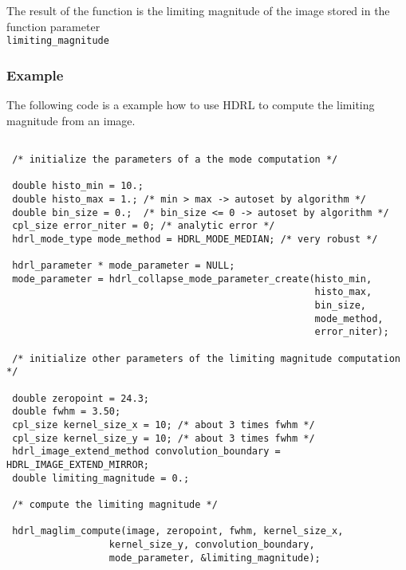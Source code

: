 The result of the function is the limiting magnitude of the image
stored in the function parameter\\ \verb+limiting_magnitude+


\subsubsection{Example}
The following code is a example how to use HDRL to compute the limiting
magnitude from an image.

\begin{lstlisting}
 
 /* initialize the parameters of a the mode computation */

 double histo_min = 10.;
 double histo_max = 1.; /* min > max -> autoset by algorithm */
 double bin_size = 0.;  /* bin_size <= 0 -> autoset by algorithm */
 cpl_size error_niter = 0; /* analytic error */
 hdrl_mode_type mode_method = HDRL_MODE_MEDIAN; /* very robust */

 hdrl_parameter * mode_parameter = NULL;
 mode_parameter = hdrl_collapse_mode_parameter_create(histo_min,
                                                      histo_max,
                                                      bin_size,
                                                      mode_method,
                                                      error_niter);
                                                      
 /* initialize other parameters of the limiting magnitude computation */

 double zeropoint = 24.3;                         
 double fwhm = 3.50;
 cpl_size kernel_size_x = 10; /* about 3 times fwhm */
 cpl_size kernel_size_y = 10; /* about 3 times fwhm */
 hdrl_image_extend_method convolution_boundary = HDRL_IMAGE_EXTEND_MIRROR;
 double limiting_magnitude = 0.;
 
 /* compute the limiting magnitude */
 
 hdrl_maglim_compute(image, zeropoint, fwhm, kernel_size_x,
       			  kernel_size_y, convolution_boundary,
       			  mode_parameter, &limiting_magnitude);
                                 
\end{lstlisting}

